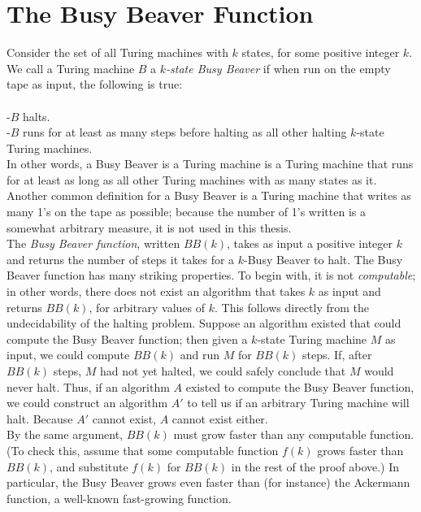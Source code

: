 \section{The Busy Beaver Function}

Consider the set of all Turing machines with $k$ states, for some positive integer $k$. We call a Turing machine $B$ a $k$\emph{-state Busy Beaver} if when run on the empty tape as input, the following is true: \\ \\
-$B$ halts. \\
-$B$ runs for at least as many steps before halting as all other halting $k$-state Turing machines. \cite{busybeaver} \\

In other words, a Busy Beaver is a Turing machine is a Turing machine that runs for at least as long as all other Turing machines with as many states as it. Another common definition for a Busy Beaver is a Turing machine that writes as many 1's on the tape as possible; because the number of 1's written is a somewhat arbitrary measure, it is not used in this thesis. \\

The \emph{Busy Beaver function}, written $BB(k)$, takes as input a positive integer $k$ and returns the number of steps it takes for a $k$-Busy Beaver to halt. The Busy Beaver function has many striking properties. To begin with, it is not \emph{computable}; in other words, there does not exist an algorithm that takes $k$ as input and returns $BB(k)$, for arbitrary values of $k$. This follows directly from the undecidability of the halting problem. Suppose an algorithm existed that could compute the Busy Beaver function; then given a $k$-state Turing machine $M$ as input, we could compute $BB(k)$ and run $M$ for $BB(k)$ steps. If, after $BB(k)$ steps, $M$ had not yet halted, we could safely conclude that $M$ would never halt. Thus, if an algorithm $A$ existed to compute the Busy Beaver function, we could construct an algorithm $A'$ to tell us if an arbitrary Turing machine will halt. Because $A'$ cannot exist, $A$ cannot exist either. \\

By the same argument, $BB(k)$ must grow faster than any computable function. (To check this, assume that some computable function $f(k)$ grows faster than $BB(k)$, and substitute $f(k)$ for $BB(k)$ in the rest of the proof above.) In particular, the Busy Beaver grows even faster than (for instance) the Ackermann function, a well-known fast-growing function. \\

